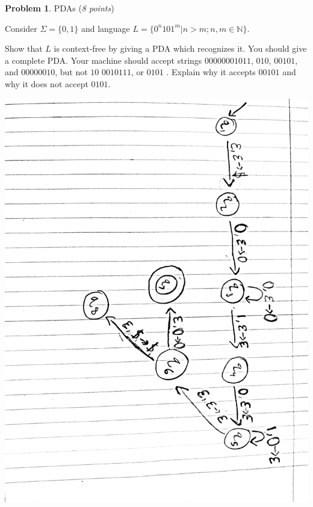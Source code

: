 \documentclass[11pt]{article}
\theoremstyle{definition}
\theoremstyle{theorem}
\newtheorem{prob}{Problem}
\newcommand{\solution}{\medskip\noindent{\color{blue}\textbf{Solution:}}}
\begin{document}
\begin{enumerate}[label=(\alph*)]
\begin{prob} PDAs (\emph{8 points})\end{prob}

Consider $\Sigma = \{0,1\}$ and language $L = \{0^n101^m | n > m; n, m \in \mathbb{N}\}$.

Show that $L$ is context-free by giving a PDA which recognizes it.
You should give a complete PDA. Your machine should accept strings $00000001011$, $010$, $00101$, and $00000010$, but not $10$ $0010111$, or $0101$ . Explain why it accepts $00101$ and why it does not accept $0101$.

\solution 

\includegraphics[angle=90,origin=c, scale=0.15]{./p3/hwp3.jpg}



\end{enumerate}
\end{document}
